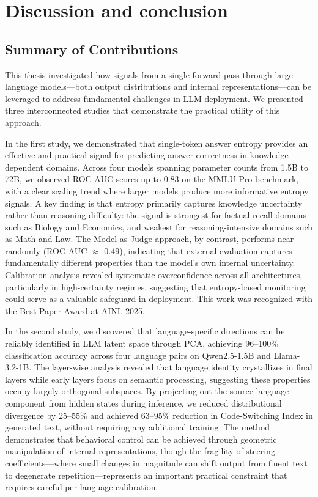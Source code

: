 \chapter{Discussion and conclusion}

\section{Summary of Contributions}

This thesis investigated how signals from a single forward pass through large language models---both output distributions and internal representations---can be leveraged to address fundamental challenges in LLM deployment. We presented three interconnected studies that demonstrate the practical utility of this approach.

In the first study, we demonstrated that single-token answer entropy provides an effective and practical signal for predicting answer correctness in knowledge-dependent domains. Across four models spanning parameter counts from 1.5B to 72B, we observed ROC-AUC scores up to 0.83 on the MMLU-Pro benchmark, with a clear scaling trend where larger models produce more informative entropy signals. A key finding is that entropy primarily captures knowledge uncertainty rather than reasoning difficulty: the signal is strongest for factual recall domains such as Biology and Economics, and weakest for reasoning-intensive domains such as Math and Law. The Model-as-Judge approach, by contrast, performs near-randomly (ROC-AUC $\approx$ 0.49), indicating that external evaluation captures fundamentally different properties than the model's own internal uncertainty. Calibration analysis revealed systematic overconfidence across all architectures, particularly in high-certainty regimes, suggesting that entropy-based monitoring could serve as a valuable safeguard in deployment. This work was recognized with the Best Paper Award at AINL 2025.

In the second study, we discovered that language-specific directions can be reliably identified in LLM latent space through PCA, achieving 96--100\% classification accuracy across four language pairs on Qwen2.5-1.5B and Llama-3.2-1B. The layer-wise analysis revealed that language identity crystallizes in final layers while early layers focus on semantic processing, suggesting these properties occupy largely orthogonal subspaces. By projecting out the source language component from hidden states during inference, we reduced distributional divergence by 25--55\% and achieved 63--95\% reduction in Code-Switching Index in generated text, without requiring any additional training. The method demonstrates that behavioral control can be achieved through geometric manipulation of internal representations, though the fragility of steering coefficients---where small changes in magnitude can shift output from fluent text to degenerate repetition---represents an important practical constraint that requires careful per-language calibration.


